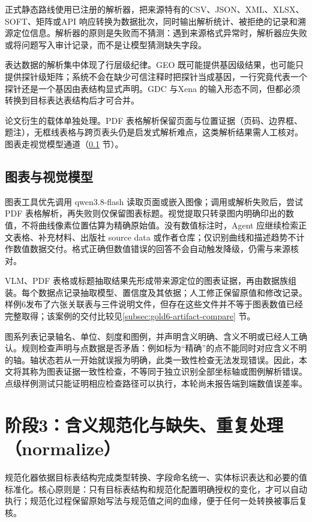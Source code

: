 正式静态路线使用已注册的解析器，把来源特有的CSV、JSON、XML、XLSX、SOFT、矩阵或API 响应转换为数据批次，同时输出解析统计、被拒绝的记录和溯源定位信息。解析器的原则是失败而不猜测：遇到来源格式异常时，解析器应失败或将问题写入审计记录，而不是让模型猜测缺失字段。

表达数据的解析集中体现了行层级纪律。GEO 既可能提供基因级结果，也可能只提供探针级矩阵；系统不会在缺少可信注释时把探针当成基因，一行究竟代表一个探针还是一个基因由表结构显式声明。GDC 与Xena 的输入形态不同，但都必须转换到目标表达表结构后才可合并。

论文衍生的载体单独处理。PDF 表格解析保留页面与位置证据（页码、边界框、题注），无框线表格与跨页表头仍是启发式解析难点，这类解析结果需人工核对。图表走视觉模型通道（\ref{subsec:chart-vlm} 节）。

\subsection{图表与视觉模型}\label{subsec:chart-vlm}

图表工具优先调用 qwen3.8-flash 读取页面或嵌入图像；调用或解析失败后，尝试 PDF 表格解析，再失败则仅保留图表标题。视觉提取只转录图内明确印出的数值，不将曲线像素位置估算为精确原始值。没有数值标注时，Agent 应继续检索正文表格、补充材料、出版社 source data 或作者仓库；仅识别曲线和描述趋势不计作数值数据交付。格式正确但数值错误的回答不会自动触发降级，仍需与来源核对。

VLM、PDF 表格或标题抽取结果先形成带来源定位的图表证据，再由数据族组装。每个数据点记录抽取模型、置信度及其依据；人工修正保留原值和修改记录。样例6发布了六张关联表与三件说明文件，但存在这些文件并不等于图表数值已经完整取得；该案例的交付比较见\ref{subsec:gold6-artifact-compare} 节。

图系列表记录轴名、单位、刻度和图例，并声明含义明确、含义不明或已经人工确认。规则检查声明与点数据是否矛盾：例如标为“精确”的点不能同时对应含义不明的轴。轴状态若从一开始就误报为明确，此类一致性检查无法发现错误。因此，本文将其称为图表证据一致性检查，不等同于独立识别全部坐标轴或图例解析错误。点级样例测试只能证明相应检查路径可以执行，本轮尚未报告端到端数值误差率。

\section{阶段3：含义规范化与缺失、重复处理（normalize）}

规范化器依据目标表结构完成类型转换、字段命名统一、实体标识表达和必要的值标准化。核心原则是：只有目标表结构和规范化配置明确授权的变化，才可以自动执行；规范化过程保留原始写法与规范值之间的血缘，便于任何一处转换被事后复核。

